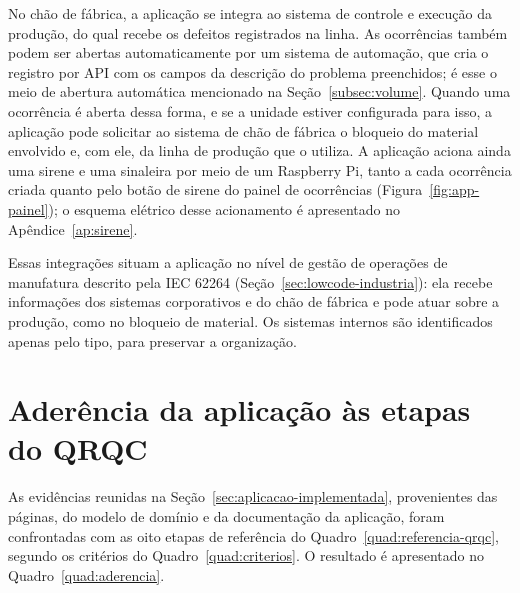 No chão de fábrica, a aplicação se integra ao sistema de controle e execução da produção, do qual recebe os defeitos registrados na linha. As ocorrências também podem ser abertas automaticamente por um sistema de automação, que cria o registro por API com os campos da descrição do problema preenchidos; é esse o meio de abertura automática mencionado na Seção~\ref{subsec:volume}. Quando uma ocorrência é aberta dessa forma, e se a unidade estiver configurada para isso, a aplicação pode solicitar ao sistema de chão de fábrica o bloqueio do material envolvido e, com ele, da linha de produção que o utiliza. A aplicação aciona ainda uma sirene e uma sinaleira por meio de um Raspberry Pi, tanto a cada ocorrência criada quanto pelo botão de sirene do painel de ocorrências (Figura~\ref{fig:app-painel}); o esquema elétrico desse acionamento é apresentado no Apêndice~\ref{ap:sirene}.



Essas integrações situam a aplicação no nível de gestão de operações de manufatura descrito pela IEC 62264 (Seção~\ref{sec:lowcode-industria}): ela recebe informações dos sistemas corporativos e do chão de fábrica e pode atuar sobre a produção, como no bloqueio de material. Os sistemas internos são identificados apenas pelo tipo, para preservar a organização.

\section{Aderência da aplicação às etapas do QRQC}
\label{sec:aderencia}

As evidências reunidas na Seção~\ref{sec:aplicacao-implementada}, provenientes das páginas, do modelo de domínio e da documentação da aplicação, foram confrontadas com as oito etapas de referência do Quadro~\ref{quad:referencia-qrqc}, segundo os critérios do Quadro~\ref{quad:criterios}. O resultado é apresentado no Quadro~\ref{quad:aderencia}.

